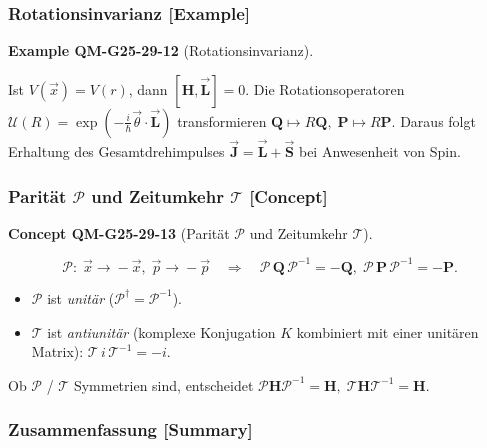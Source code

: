 \documentclass[10pt, letterpaper]{article}
\newcommand{\CustomHeading}[3]{%
  \par\medskip\noindent%
  \textbf{#1 #2} \textnormal{(#3)}.\enskip%
}
\newenvironment{EXA}[2]{\begin{unitbox}\CustomHeading{Example}{#1}{#2}}{\end{unitbox}}
\newenvironment{CONC}[2]{\begin{unitbox}\CustomHeading{Concept}{#1}{#2}}{\end{unitbox}}
\begin{document}
\subsubsection*{Rotationsinvarianz [Example]}

\begin{EXA}{QM-G25-29-12}{Rotationsinvarianz}
Ist $V(\vec x)=V(r)$, dann
\(
[\mathbf H,\vec{\mathbf L}]=0.
\)
Die Rotationsoperatoren
\(
\mathcal U(R)=\exp(-\tfrac{i}{\hbar}\vec\theta\!\cdot\!\vec{\mathbf L})
\)
transformieren
\(
\mathbf Q\mapsto R\mathbf Q,\;
\mathbf P\mapsto R\mathbf P.
\)
Daraus folgt Erhaltung des Gesamtdrehimpulses
\(
\vec{\mathbf J}=\vec{\mathbf L}+\vec{\mathbf S}
\)
bei Anwesenheit von Spin.
\end{EXA}


\subsubsection*{Parität $\mathcal P$ und Zeitumkehr $\mathcal T$ [Concept]}

\begin{CONC}{QM-G25-29-13}{Parität $\mathcal P$ und Zeitumkehr $\mathcal T$}
\[
\mathcal P:\;
\vec x\!\to\!-\vec x,\;
\vec p\!\to\!-\vec p
\quad\Longrightarrow\quad
\mathcal P\,\mathbf Q\,\mathcal P^{-1}=-\mathbf Q,
\;
\mathcal P\,\mathbf P\,\mathcal P^{-1}=-\mathbf P.
\]

\begin{itemize}
\item $\mathcal P$ ist \emph{unitär} ($\mathcal P^\dagger=\mathcal P^{-1}$).
\item $\mathcal T$ ist \emph{antiunitär} (komplexe Konjugation $K$ kombiniert
      mit einer unitären Matrix):  
      \(
      \mathcal T\,i\,\mathcal T^{-1}=-i.
      \)
\end{itemize}

Ob $\mathcal P$ / $\mathcal T$ Symmetrien sind, entscheidet
\(
\mathcal P\mathbf H\mathcal P^{-1}=\mathbf H,\;
\mathcal T\mathbf H\mathcal T^{-1}=\mathbf H.
\)
\end{CONC}


\subsubsection*{Zusammenfassung [Summary]}
\end{document}
